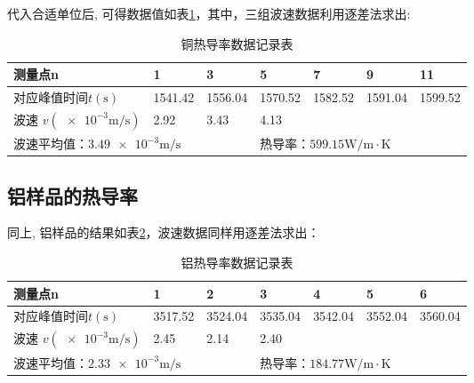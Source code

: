 \documentclass[11pt]{article}
\begin{document}
代入合适单位后, 可得数据值如表\ref{tab:Cu}，其中，三组波速数据利用逐差法求出:
\begin{table}[htbp]
	\centering
	\begin{tabular}{|lll|llll|}
		\hline
		\multicolumn{1}{|l|}{测量点n}                           & \multicolumn{1}{l|}{1}       & 3       & \multicolumn{1}{l|}{5}       & \multicolumn{1}{l|}{7}       & \multicolumn{1}{l|}{9}       & 11      \\ \hline
		\multicolumn{1}{|l|}{对应峰值时间$t (\mathrm{s})$}                    & \multicolumn{1}{l|}{1541.42} & 1556.04 & \multicolumn{1}{l|}{1570.52} & \multicolumn{1}{l|}{1582.52} & \multicolumn{1}{l|}{1591.04} & 1599.52 \\ \hline
		\multicolumn{1}{|l|}{波速 $v (\num{e-3} \mathrm{m/s})$} & \multicolumn{1}{l|}{2.92}    & 3.43    & \multicolumn{1}{l|}{4.13}    & \multicolumn{1}{l|}{}        & \multicolumn{1}{l|}{}        &         \\ \hline
		\multicolumn{3}{|l|}{波速平均值：$\num{3.49e-3} \mathrm{m/s}$}                                                              & \multicolumn{4}{l|}{热导率：$599.15 \mathrm{W/m \cdot K}$}                                                                \\ \hline
	\end{tabular}
	\caption{铜热导率数据记录表}
	\label{tab:Cu}
\end{table}



\subsection{铝样品的热导率}

同上, 铝样品的结果如表\ref{tab:Al}，波速数据同样用逐差法求出：

\begin{table}[htbp]
	\centering
	\begin{tabular}{|lll|llll|}
		\hline
		\multicolumn{1}{|l|}{测量点n}                           & \multicolumn{1}{l|}{1}       & 2       & \multicolumn{1}{l|}{3}       & \multicolumn{1}{l|}{4}       & \multicolumn{1}{l|}{5}       & 6      \\ \hline
		\multicolumn{1}{|l|}{对应峰值时间$t (\mathrm{s})$}                    & \multicolumn{1}{l|}{3517.52} & 3524.04 & \multicolumn{1}{l|}{3535.04} & \multicolumn{1}{l|}{3542.04} & \multicolumn{1}{l|}{3552.04} & 3560.04 \\ \hline
		\multicolumn{1}{|l|}{波速 $v (\num{e-3} \mathrm{m/s})$} & \multicolumn{1}{l|}{2.45}    & 2.14    & \multicolumn{1}{l|}{2.40}    & \multicolumn{1}{l|}{}        & \multicolumn{1}{l|}{}        &         \\ \hline
		\multicolumn{3}{|l|}{波速平均值：$\num{2.33e-3} \mathrm{m/s}$}                                                              & \multicolumn{4}{l|}{热导率：$184.77 \mathrm{W/m \cdot K}$}                                                                \\ \hline
	\end{tabular}
	\caption{铝热导率数据记录表}
	\label{tab:Al}
\end{table}
\end{document}
